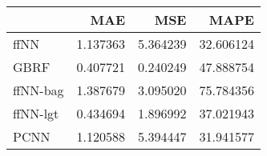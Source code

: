 \begin{tabular}{lrrr}
\toprule
{} &       MAE &       MSE &       MAPE \\
\midrule
ffNN     &  1.137363 &  5.364239 &  32.606124 \\
GBRF     &  0.407721 &  0.240249 &  47.888754 \\
ffNN-bag &  1.387679 &  3.095020 &  75.784356 \\
ffNN-lgt &  0.434694 &  1.896992 &  37.021943 \\
PCNN     &  1.120588 &  5.394447 &  31.941577 \\
\bottomrule
\end{tabular}
